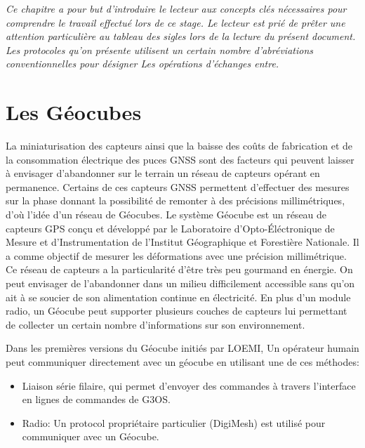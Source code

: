 \documentclass{themeensg}
\begin{document}


\textit{ Ce chapitre a pour but d'introduire le lecteur aux concepts clés nécessaires pour comprendre le travail effectué lors de ce stage.
Le lecteur est prié de prêter une attention particulière au tableau des sigles lors de la lecture du présent document. Les protocoles qu'on présente utilisent un certain nombre d’abréviations conventionnelles pour désigner Les opérations d'échanges entre. }

\section{Les Géocubes}
La miniaturisation des capteurs ainsi que la baisse des coûts de fabrication et de la consommation électrique des puces GNSS sont des facteurs qui peuvent laisser à envisager d'abandonner sur le terrain un réseau de capteurs opérant en permanence. Certains de ces capteurs GNSS permettent d'effectuer des mesures sur la phase donnant la possibilité de remonter à des précisions millimétriques, d'où l'idée d'un réseau de Géocubes. Le système Géocube est un réseau de capteurs GPS conçu et développé par le Laboratoire d'Opto-Éléctronique de Mesure et d'Instrumentation de l'Institut Géographique et Forestière Nationale. Il a comme objectif de mesurer les déformations avec une précision millimétrique. Ce réseau de capteurs a la particularité d'être très peu gourmand en énergie. On peut envisager de l'abandonner dans un milieu difficilement accessible sans qu'on ait à se soucier de son alimentation continue en électricité. En plus d'un module radio, un Géocube peut supporter plusieurs couches de capteurs lui permettant de collecter un certain nombre d'informations sur son environnement.

Dans les premières versions du Géocube initiés par LOEMI, Un opérateur humain peut communiquer directement avec un géocube en utilisant une de ces méthodes:

\begin{itemize}
\item Liaison série filaire, qui permet d'envoyer des commandes  à travers l'interface en lignes de commandes de G3OS.
\item Radio: Un protocol propriétaire particulier (DigiMesh\textcopyright) est utilisé pour communiquer avec un Géocube.
\end{itemize}
\end{document}
